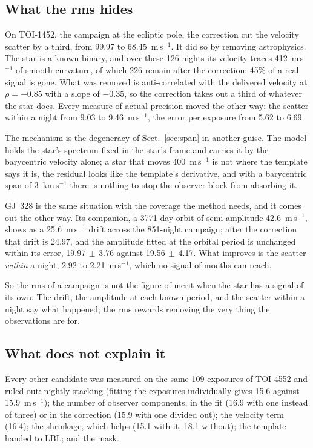 \documentclass[11pt]{article}
\begin{document}
\subsection{What the rms hides}
\label{sec:hides}

On TOI-1452, the campaign at the ecliptic pole, the correction cut the velocity
scatter by a third, from 99.97 to 68.45~m\,s$^{-1}$. It did so by removing
astrophysics. The star is a known binary, and over these 126 nights its velocity
traces 412~m\,s$^{-1}$ of smooth curvature, of which 226 remain after the
correction: 45\% of a real signal is gone. What was removed is anti-correlated
with the delivered velocity at $\rho = -0.85$ with a slope of $-0.35$, so the
correction takes out a third of whatever the star does. Every measure of actual
precision moved the other way: the scatter within a night from 9.03 to
9.46~m\,s$^{-1}$, the error per exposure from 5.62 to 6.69.

The mechanism is the degeneracy of Sect.~\ref{sec:span} in another guise. The
model holds the star's spectrum fixed in the star's frame and carries it by the
barycentric velocity alone; a star that moves 400~m\,s$^{-1}$ is not where the
template says it is, the residual looks like the template's derivative, and with
a barycentric span of 3~km\,s$^{-1}$ there is nothing to stop the observer block
from absorbing it.

GJ~328 is the same situation with the coverage the method needs, and it comes
out the other way. Its companion, a 3771-day orbit of semi-amplitude
42.6~m\,s$^{-1}$, shows as a 25.6~m\,s$^{-1}$ drift across the 851-night
campaign; after the correction that drift is 24.97, and the amplitude fitted at
the orbital period is unchanged within its error, 19.97$\,\pm\,$3.76 against
19.56$\,\pm\,$4.17. What improves is the scatter \emph{within} a night, 2.92 to
2.21~m\,s$^{-1}$, which no signal of months can reach.

So the rms of a campaign is not the figure of merit when the star has a signal
of its own. The drift, the amplitude at each known period, and the scatter
within a night say what happened; the rms rewards removing the very thing the
observations are for.

\subsection{What does not explain it}

Every other candidate was measured on the same 109 exposures of TOI-4552 and
ruled out: nightly stacking (fitting the exposures individually gives 15.6
against 15.9~m\,s$^{-1}$); the number of observer components, in the fit
(16.9 with one instead of three) or in the correction (15.9 with one divided
out); the velocity term (16.4); the shrinkage, which helps (15.1 with it, 18.1
without); the template handed to LBL; and the mask.
\end{document}
